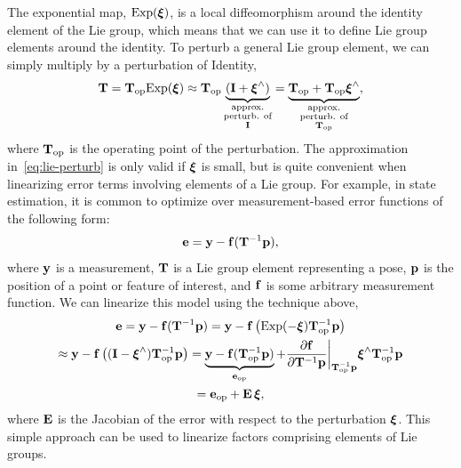 The exponential map, $\mbox{Exp}({\boldsymbol{\xi}})$, is a local diffeomorphism around the identity element of the Lie group, which means that we can use it to define Lie group elements around the identity. To perturb a general Lie group element, we can simply multiply by a perturbation of Identity,
\begin{equation}\label{eq:lie-perturb}
\mathbf{T} = \mathbf{T}_{\rm op}\mbox{Exp}({\boldsymbol{\xi}}) \approx \mathbf{T}_{\rm op} \underbrace{(\mathbf{I}+{\boldsymbol{\xi}}^\wedge)}_{\substack{\text{approx.} \\\text{perturb. of}\\\mathbf{I}}} = \underbrace{\mathbf{T}_{\rm op} + \mathbf{T}_{\rm op} {\boldsymbol{\xi}}^\wedge}_{\substack{\text{approx.} \\\text{perturb. of}\\\mathbf{T}_{\rm op}}},
\end{equation}
where $\mathbf{T}_{\rm op}$ is the operating point of the perturbation. The approximation in~\eqref{eq:lie-perturb} is only valid if ${\boldsymbol{\xi}}$ is small, but is quite convenient when linearizing error terms involving elements of a Lie group.  For example, in state estimation, it is common to optimize over measurement-based error functions of the following form: 
\begin{equation}
     \mathbf{e} = \mathbf{y} - \mathbf{f}(\mathbf{T}^{-1} \mathbf{p}),
\end{equation}
where $\mathbf{y}$ is a measurement, $\mathbf{T}$ is a Lie group element representing a pose, $\mathbf{p}$ is the position of a point or feature of interest, and $\mathbf{f}$ is some arbitrary measurement function. We can linearize this model using the technique above,
\begin{multline}
\mathbf{e} = \mathbf{y} - \mathbf{f}(\mathbf{T}^{-1} \mathbf{p}) = \mathbf{y} - \mathbf{f}\left(\mbox{Exp}(-{\boldsymbol{\xi}}) \mathbf{T}_{\rm op}^{-1} \mathbf{p}\right) \\ \approx \mathbf{y} - \mathbf{f}\left((\mathbf{I}-{\boldsymbol{\xi}}^\wedge) \mathbf{T}_{\rm op}^{-1} \mathbf{p}\right) = \underbrace{\mathbf{y} - \mathbf{f}(\mathbf{T}_{\rm op}^{-1} \mathbf{p})}_{\mathbf{e}_{\rm op}} + \frac{\partial \mathbf{f}}{\partial \mathbf{T}^{-1}\mathbf{p}} \bigg|_{\mathbf{T}_{\rm op}^{-1} \mathbf{p}} {\boldsymbol{\xi}}^\wedge \mathbf{T}_{\rm op}^{-1} \mathbf{p} \\ =\mathbf{e}_{\rm op} + \mathbf{E} \, {\boldsymbol{\xi}},
\end{multline}
where $\mathbf{E}$ is the Jacobian of the error with respect to the perturbation ${\boldsymbol{\xi}}$.  This simple approach can be used to linearize factors comprising elements of Lie groups.

